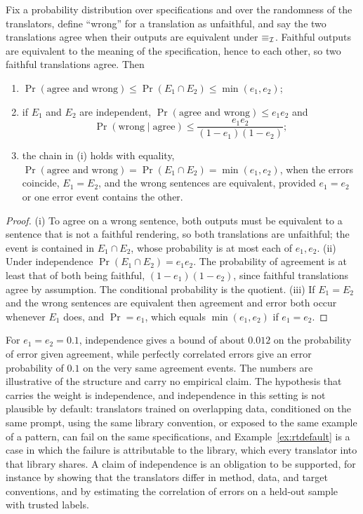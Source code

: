 \begin{proposition}
\label{prop:independent}
Fix a probability distribution over specifications and over the randomness of the translators, define ``wrong'' for a translation as unfaithful, and say the two translations agree when their outputs are equivalent under $\equiv_{\mathcal{I}}$. Faithful outputs are equivalent to the meaning of the specification, hence to each other, so two faithful translations agree. Then
\begin{enumerate}[label=(\roman*)]
\item $\Pr(\text{agree and wrong}) \le \Pr(E_1\cap E_2) \le \min(e_1,e_2)$;
\item if $E_1$ and $E_2$ are independent, $\Pr(\text{agree and wrong}) \le e_1 e_2$ and
\[
\Pr(\text{wrong}\mid\text{agree}) \le \frac{e_1e_2}{(1-e_1)(1-e_2)};
\]
\item the chain in (i) holds with equality, $\Pr(\text{agree and wrong})=\Pr(E_1\cap E_2)=\min(e_1,e_2)$, when the errors coincide, $E_1=E_2$, and the wrong sentences are equivalent, provided $e_1=e_2$ or one error event contains the other.
\end{enumerate}
\end{proposition}

\begin{proof}
(i) To agree on a wrong sentence, both outputs must be equivalent to a sentence that is not a faithful rendering, so both translations are unfaithful; the event is contained in $E_1\cap E_2$, whose probability is at most each of $e_1,e_2$. (ii) Under independence $\Pr(E_1\cap E_2)=e_1e_2$. The probability of agreement is at least that of both being faithful, $(1-e_1)(1-e_2)$, since faithful translations agree by assumption. The conditional probability is the quotient. (iii) If $E_1=E_2$ and the wrong sentences are equivalent then agreement and error both occur whenever $E_1$ does, and $\Pr=e_1$, which equals $\min(e_1,e_2)$ if $e_1=e_2$.
\end{proof}

For $e_1=e_2=0.1$, independence gives a bound of about $0.012$ on the probability of error given agreement, while perfectly correlated errors give an error probability of $0.1$ on the very same agreement events. The numbers are illustrative of the structure and carry no empirical claim. The hypothesis that carries the weight is independence, and independence in this setting is not plausible by default: translators trained on overlapping data, conditioned on the same prompt, using the same library convention, or exposed to the same example of a pattern, can fail on the same specifications, and Example~\ref{ex:rtdefault} is a case in which the failure is attributable to the library, which every translator into that library shares. A claim of independence is an obligation to be supported, for instance by showing that the translators differ in method, data, and target conventions, and by estimating the correlation of errors on a held-out sample with trusted labels.

